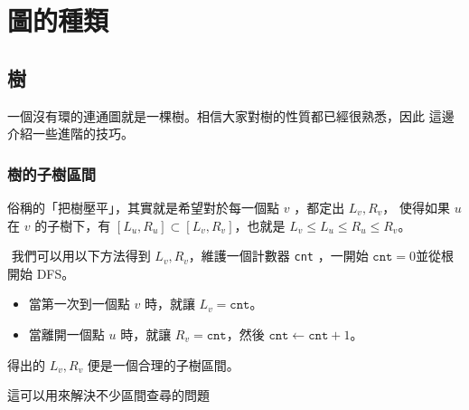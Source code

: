 \documentclass[a4paper,12pt]{book}
\begin{document}
\newcommand{\str}[1]{\texttt{"#1"}}
\newcommand{\mcstr}[2]{\texttt{"#1}\cdots\texttt{#2"}}
\newcommand{\ord}[1]{\opord\left(#1\right)}
\newcommand{\abs}[1]{\lvert #1 \rvert}
\newcommand{\floor}[1]{\lfloor #1 \rfloor}
\newcommand{\ceil}[1]{\lceil #1 \rceil}
\newcommand{\opord}{\operatorname{\mathcal{O}}}
\newcommand{\fail}{\operatorname{\mathcal{F}}}
\newcommand{\flk}{\operatorname{\mathfrak{F}}}
\newcommand{\suf}{\operatorname{\sigma}}
\newcommand{\rank}{\operatorname{\mathcal{R}}}
\newcommand{\sa}{\operatorname{\mathcal{SA}}}
\newcommand{\hei}{\operatorname{\mathcal{H}}}
\newcommand{\edps}{\operatorname{\mathcal{E}}}
\newcommand{\mx}{\operatorname{\mathcal{M}}}
\newcommand{\argmax}{\operatorname{arg\,max}}
\newcommand{\cons}[1]{\left[ \: #1 \: \right]}

\newcommand\numbereqn{\addtocounter{equation}{1}\tag{\theequation}}
\newcommand\listeqn{\hfill\refstepcounter{equation}(\theequation)}
\newenvironment{monobox}{\linespread{0.6}\Verbatim[frame=single, commandchars=\\\{\}]}{\endVerbatim}
\makeatletter


\section{圖的種類}
\subsection{樹}
一個沒有環的連通圖就是一棵樹。相信大家對樹的性質都已經很熟悉，因此
這邊介紹一些進階的技巧。

\subsubsection{樹的子樹區間}
俗稱的「把樹壓平」，其實就是希望對於每一個點 $v$ ，都定出 $L_v, R_v$，
使得如果 $u$ 在 $v$ 的子樹下，有 $[L_u, R_u] \subset [L_v, R_v]$，也就是
$L_v \leq L_u \leq R_u \leq R_v$。
\begin{theorem}[樹的子樹區間]
  $\texttt{}$ 我們可以用以下方法得到 $L_v, R_v$，維護一個計數器 \texttt{cnt}
  ，一開始 $\texttt{cnt} = 0$並從根開始 DFS。
  \begin{itemize}
      \item 當第一次到一個點 $v$ 時，就讓 $L_v = \texttt{cnt}$。
      \item 當離開一個點 $u$ 時，就讓 $R_v = \texttt{cnt}$，然後 $\texttt{cnt}
          \gets \texttt{cnt} + 1$。
  \end{itemize}
  得出的 $L_v, R_v$ 便是一個合理的子樹區間。
\end{theorem}
這可以用來解決不少區間查尋的問題
\end{document}
